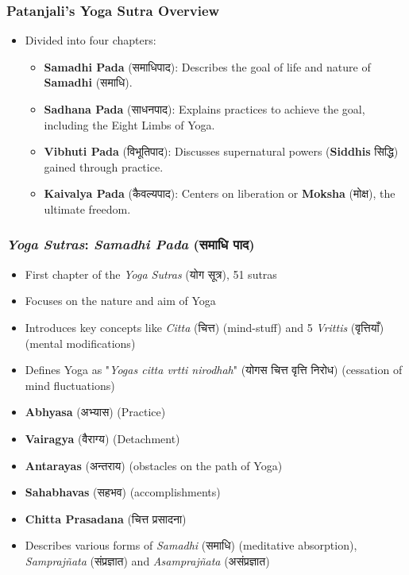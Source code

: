 \begin{frame}[fragile]\frametitle{Patanjali's Yoga Sutra Overview}
    \begin{itemize}
        \item Divided into four chapters:
        \begin{itemize}
            \item \textbf{Samadhi Pada} (समाधिपाद): Describes the goal of life and nature of \textbf{Samadhi} (समाधि).
            \item \textbf{Sadhana Pada} (साधनपाद): Explains practices to achieve the goal, including the Eight Limbs of Yoga.
            \item \textbf{Vibhuti Pada} (विभूतिपाद): Discusses supernatural powers (\textbf{Siddhis} सिद्धि) gained through practice.
            \item \textbf{Kaivalya Pada} (कैवल्यपाद): Centers on liberation or \textbf{Moksha} (मोक्ष), the ultimate freedom.
        \end{itemize}
    \end{itemize}
\end{frame}

\begin{frame}[fragile]\frametitle{\textit{Yoga Sutras}: \textit{Samadhi Pada} (समाधि पाद)}

    \begin{itemize}
        \item First chapter of the \textit{Yoga Sutras} (योग सूत्र), 51 sutras
        \item Focuses on the nature and aim of Yoga
        \item Introduces key concepts like \textit{Citta} (चित्त) (mind-stuff) and 5 \textit{Vrittis} (वृत्तियाँ) (mental modifications)
        \item Defines Yoga as "\textit{Yogas citta vrtti nirodhah}" (योगस चित्त वृत्ति निरोध) (cessation of mind fluctuations)
        \item \textbf{Abhyasa} (अभ्यास) (Practice)
        \item \textbf{Vairagya} (वैराग्य) (Detachment)
        \item \textbf{Antarayas} (अन्तराय) (obstacles on the path of Yoga)
        \item \textbf{Sahabhavas} (सहभव) (accomplishments)
        \item \textbf{Chitta Prasadana} (चित्त प्रसादना)
        \item Describes various forms of \textit{Samadhi} (समाधि) (meditative absorption), \textit{Samprajñata} (संप्रज्ञात) and \textit{Asamprajñata} (असंप्रज्ञात)
    \end{itemize}

\end{frame}



